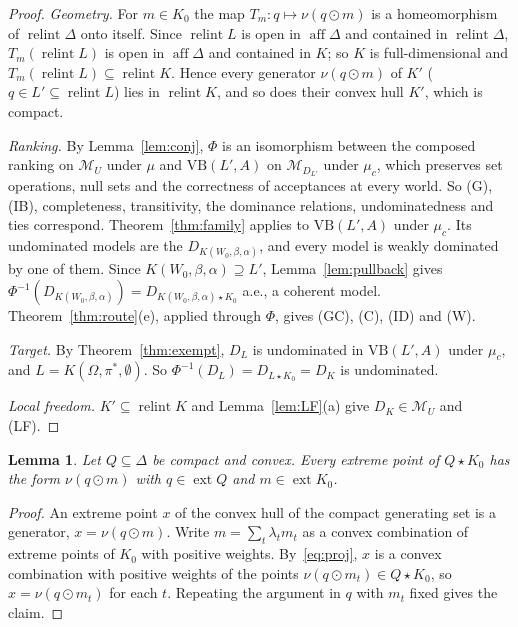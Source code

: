 \documentclass[11pt]{article}
\newcommand{\M}{\mathcal{M}}
\newcommand{\VB}{\mathrm{VB}}
\DeclareMathOperator{\relint}{relint}
\DeclareMathOperator{\aff}{aff}
\DeclareMathOperator{\ext}{ext}
\theoremstyle{plain}
\newtheorem{lemma}[theorem]{Lemma}
\theoremstyle{definition}
\theoremstyle{remark}
\begin{document}
\begin{proof}
\emph{Geometry.} For $m\in K_0$ the map $T_m:q\mapsto\nu(q\odot m)$ is a homeomorphism of
$\relint\Delta$ onto itself. Since $\relint L$ is open in $\aff\Delta$ and contained in
$\relint\Delta$, $T_m(\relint L)$ is open in $\aff\Delta$ and contained in $K$; so $K$ is
full-dimensional and $T_m(\relint L)\subseteq\relint K$. Hence every generator $\nu(q\odot
m)$ of $K'$ ($q\in L'\subseteq\relint L$) lies in $\relint K$, and so does their convex
hull $K'$, which is compact.

\emph{Ranking.} By Lemma~\ref{lem:conj}, $\Phi$ is an isomorphism between the composed
ranking on $\M_U$ under $\mu$ and $\VB(L',A)$ on $\M_{D_{L'}}$ under $\mu_c$, which
preserves set operations, null sets and the correctness of acceptances at every world.
So (G), (IB), completeness, transitivity, the dominance relations, undominatedness and ties
correspond. Theorem~\ref{thm:family} applies to $\VB(L',A)$ under $\mu_c$. Its undominated
models are the $D_{K(W_0,\beta,\alpha)}$, and every model is weakly dominated by one of
them. Since $K(W_0,\beta,\alpha)\supseteq L'$, Lemma~\ref{lem:pullback} gives
$\Phi^{-1}(D_{K(W_0,\beta,\alpha)})=D_{K(W_0,\beta,\alpha)\star K_0}$ a.e., a coherent
model. Theorem~\ref{thm:route}(e), applied through $\Phi$, gives (GC), (C), (ID) and (W).

\emph{Target.} By Theorem~\ref{thm:exempt}, $D_L$ is undominated in $\VB(L',A)$ under
$\mu_c$, and $L=K(\Omega,\pi^\ast,\emptyset)$. So $\Phi^{-1}(D_L)=D_{L\star K_0}=D_K$ is
undominated.

\emph{Local freedom.} $K'\subseteq\relint K$ and Lemma~\ref{lem:LF}(a) give $D_K\in\M_U$
and (LF).
\end{proof}

\begin{lemma}\label{lem:reach}
Let $Q\subseteq\Delta$ be compact and convex. Every extreme point of $Q\star K_0$ has the
form $\nu(q\odot m)$ with $q\in\ext Q$ and $m\in\ext K_0$.
\end{lemma}

\begin{proof}
An extreme point $x$ of the convex hull of the compact generating set is a generator,
$x=\nu(q\odot m)$. Write $m=\sum_t\lambda_tm_t$ as a convex combination of extreme points
of $K_0$ with positive weights. By~\eqref{eq:proj}, $x$ is a convex combination with
positive weights of the points $\nu(q\odot m_t)\in Q\star K_0$, so $x=\nu(q\odot m_t)$ for
each $t$. Repeating the argument in $q$ with $m_t$ fixed gives the claim.
\end{proof}
\end{document}
